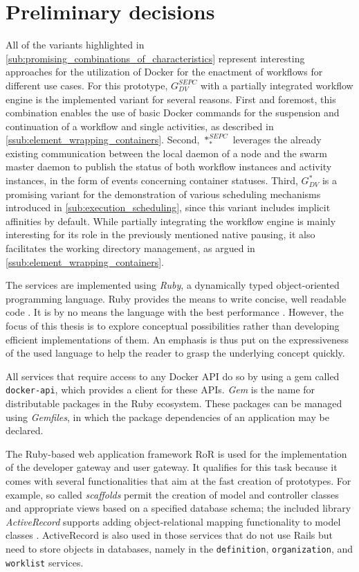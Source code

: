 
\section{Preliminary decisions} %
\label{sec:design_decisions}
  All of the variants highlighted in \ref{sub:promising_combinations_of_characteristics} represent interesting approaches for the utilization of Docker for the enactment of workflows for different use cases.
  For this prototype, $G_{DV}^{SEPC}$ with a partially integrated workflow engine is the implemented variant for several reasons. First and foremost, this combination enables the use of basic Docker commands for the suspension and continuation of a workflow and single activities, as described in \ref{ssub:element_wrapping_containers}. Second, $*_{*}^{SEPC}$ leverages the already existing communication between the local daemon of a node and the swarm master daemon to publish the status of both workflow instances and activity instances, in the form of events concerning container statuses. Third, $G_{DV}^{*}$ is a promising variant for the demonstration of  various scheduling mechanisms introduced in \ref{sub:execution_scheduling}, since this variant includes implicit affinities by default. While partially integrating the workflow engine is mainly interesting for its role in the previously mentioned native pausing, it also facilitates the working directory management, as argued in \ref{ssub:element_wrapping_containers}.

  The services are implemented using \emph{Ruby}, a dynamically typed object-oriented programming language. Ruby provides the means to write concise, well readable code \cite[p.~782]{Nanz2015Comparative}. It is by no means the language with the best performance \cite[p.~786]{Nanz2015Comparative}. However, the focus of this thesis is to explore conceptual possibilities rather than developing efficient implementations of them. An emphasis is thus put on the expressiveness of the used language to help the reader to grasp the underlying concept quickly.

  All services that require access to any Docker \ac{API} do so by using a gem called \texttt{docker-api}, which provides a client for these \acp{API}. \emph{Gem} is the name for distributable packages in the Ruby ecosystem. These packages can be managed using \emph{Gemfiles}, in which the package dependencies of an application may be declared.

  The Ruby-based web application framework \ac{RoR} is used for the implementation of the developer gateway and user gateway. It qualifies for this task because it comes with several functionalities that aim at the fast creation of prototypes. For example, so called \emph{scaffolds} permit the creation of model and controller classes and appropriate views based on a specified database schema; the included library \emph{ActiveRecord} supports adding object-relational mapping functionality to model classes \cite[p.~5]{Jazayeri2007Some}. ActiveRecord is also used in those services that do not use Rails but need to store objects in databases, namely in the \texttt{definition}, \texttt{organization}, and \texttt{worklist} services.

